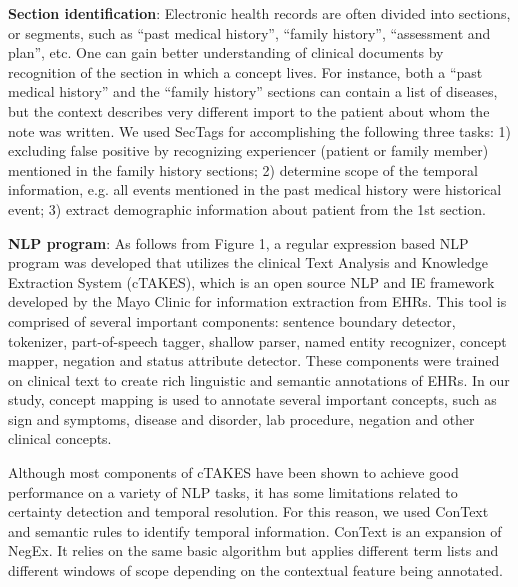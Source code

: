 \documentclass{amia}
\begin{document}
\textbf {Section identification}:
Electronic health records are often divided into sections, or segments, such as ``past medical history'', ``family history'', ``assessment and plan'', etc. One can gain better understanding of clinical documents by recognition of the section in which a concept lives. For instance, both a ``past medical history'' and the ``family history'' sections can contain a list of diseases, but the context describes very different import to the patient about whom the note was written. We used SecTags for accomplishing the following three tasks: 1) excluding false positive by recognizing experiencer (patient or family member) mentioned in the family history sections; 2) determine scope of the temporal information, e.g. all events mentioned in the past medical history were historical event; 3) extract demographic information about patient from the 1st section.

\textbf {NLP program}:
As follows from Figure 1, a regular expression based NLP program was developed that utilizes the clinical Text Analysis and Knowledge Extraction System (cTAKES), which is an open source NLP and IE framework developed by the Mayo Clinic for information extraction from EHRs. This tool is comprised of several important components: sentence boundary detector, tokenizer, part-of-speech tagger, shallow parser, named entity recognizer, concept mapper, negation and status attribute detector. These components were trained on clinical text to create rich linguistic and semantic annotations of EHRs. In our study, concept mapping is used to annotate several important concepts, such as sign and symptoms, disease and disorder, lab procedure, negation and other clinical concepts.

Although most components of cTAKES have been shown to achieve good performance on a variety of NLP tasks, it has some limitations  \cite{savova2010mayo} related to certainty detection and temporal resolution. For this reason, we used ConText and semantic rules to identify temporal information. ConText is an expansion of NegEx. It relies on the same basic algorithm but applies different term lists and different windows of scope depending on the contextual feature being annotated.
 
\end{document}
